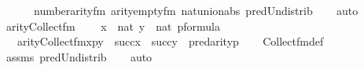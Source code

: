 \begin{isabellebody}
\ \ \ \ \ \ number{}arity{\isacharunderscore}{\kern0pt}{\isacharunderscore}{\kern0pt}fm\ arity{\isacharunderscore}{\kern0pt}empty{\isacharunderscore}{\kern0pt}fm\ nat{\isacharunderscore}{\kern0pt}union{\isacharunderscore}{\kern0pt}abs{}\ pred{\isacharunderscore}{\kern0pt}Un{\isacharunderscore}{\kern0pt}distrib\isanewline
\ \ \isamarkupfalse%
\ auto%
\endisatagproof
{\isafoldproof}%
%
\isadelimproof
\isanewline
%
\endisadelimproof
\isanewline
{}\isamarkupfalse%
\ arity{\isacharunderscore}{\kern0pt}Collect{\isacharunderscore}{\kern0pt}fm\ {\isacharcolon}{\kern0pt}\isanewline
\ \ \ {\isachardoublequoteopen}x\ {\isasymin}\ nat{\isachardoublequoteclose}\ {\isachardoublequoteopen}y\ {\isasymin}\ nat{\isachardoublequoteclose}\ {\isachardoublequoteopen}p{\isasymin}formula{\isachardoublequoteclose}\ \isanewline
\ \ \ {\isachardoublequoteopen}arity{\isacharparenleft}{\kern0pt}Collect{\isacharunderscore}{\kern0pt}fm{\isacharparenleft}{\kern0pt}x{\isacharcomma}{\kern0pt}p{\isacharcomma}{\kern0pt}y{\isacharparenright}{\kern0pt}{\isacharparenright}{\kern0pt}\ {\isacharequal}{\kern0pt}\ succ{\isacharparenleft}{\kern0pt}x{\isacharparenright}{\kern0pt}\ {\isasymunion}\ succ{\isacharparenleft}{\kern0pt}y{\isacharparenright}{\kern0pt}\ {\isasymunion}\ pred{\isacharparenleft}{\kern0pt}arity{\isacharparenleft}{\kern0pt}p{\isacharparenright}{\kern0pt}{\isacharparenright}{\kern0pt}{\isachardoublequoteclose}\isanewline
%
\isadelimproof
\ \ %
\endisadelimproof
%
\isatagproof
{}\isamarkupfalse%
\ Collect{\isacharunderscore}{\kern0pt}fm{\isacharunderscore}{\kern0pt}def\isanewline
\ \ \isamarkupfalse%
\ assms\ pred{\isacharunderscore}{\kern0pt}Un{\isacharunderscore}{\kern0pt}distrib\isanewline
\ \ \isamarkupfalse%
\ auto%
\endisatagproof
{\isafoldproof}%
%
\isadelimproof
\isanewline
%
\endisadelimproof
%
\isadelimtheory
\isanewline
%
\endisadelimtheory
%
\isatagtheory
{}\isamarkupfalse%
%
\endisatagtheory
{\isafoldtheory}%
%
\isadelimtheory
%
\endisadelimtheory
%
\end{isabellebody}%
\endinput
